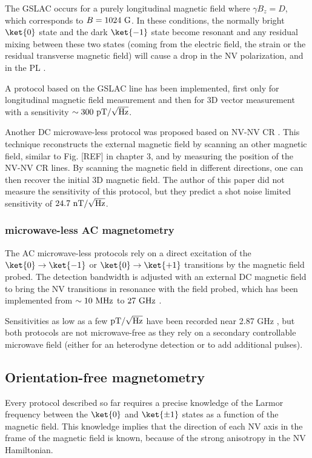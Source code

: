 \documentclass[a4paper,11pt]{report}
\begin{document}
\begin{refsection}
The GSLAC occurs for a purely longitudinal magnetic field where $\gamma B_z = D$, which corresponds to $B=1024\ \rm G$. In these conditions, the normally bright $\ket{0}$ state and the dark $\ket{-1}$ state become resonant and any residual mixing between these two states (coming from the electric field, the strain or the residual transverse magnetic field) will cause a drop in the NV polarization, and in the PL \citep{broadway2016anticrossing}. 

A protocol based on the GSLAC line has been implemented, first only for longitudinal magnetic field measurement \citep{wickenbrock2016microwave} and then for 3D vector measurement \citep{zheng2020microwave} with a sensitivity $\sim 300\ \rm pT/\sqrt{\rm Hz}$.

Another DC microwave-less protocol was proposed based on NV-NV CR \citep{akhmedzhanov2017microwave, akhmedzhanov2019magnetometry}. This technique reconstructs the external magnetic field by scanning an other magnetic field, similar to Fig. [REF] in chapter 3, and by measuring the position of the NV-NV CR lines. By scanning the magnetic field in different directions, one can then recover the initial 3D magnetic field. The author of this paper did not measure the sensitivity of this protocol, but they predict a shot noise limited sensitivity of $24.7\ \rm nT/\sqrt{\rm Hz}$.

\subsubsection{microwave-less AC magnetometry}
The AC microwave-less protocols rely on a direct excitation of the $\ket{0} \to \ket{-1}$ or $\ket{0} \to \ket{+1}$ transitions by the magnetic field probed. The detection bandwidth is adjusted with an external DC magnetic field to bring the NV transitions in resonance with the field probed, which has been implemented from $\sim 10\ \rm MHz$ to $27\ \rm GHz$ \citep{magaletti2022quantum}.

Sensitivities as low as a few $\rm pT/\sqrt{\rm Hz}$ have been recorded near 2.87 GHz \citep{wang2022picotesla, alsid2022solid}, but both protocols are not microwave-free as they rely on a secondary controllable microwave field (either for an heterodyne detection or to add additional pulses).

\subsection{Orientation-free magnetometry}
Every protocol described so far requires a precise knowledge  of the Larmor frequency between the $\ket{0}$ and $\ket{\pm 1}$ states as a function of the magnetic field. This knowledge implies that the direction of each NV axis in the frame of the magnetic field is known, because of the strong anisotropy in the NV Hamiltonian. 


\end{refsection}
\end{document}
